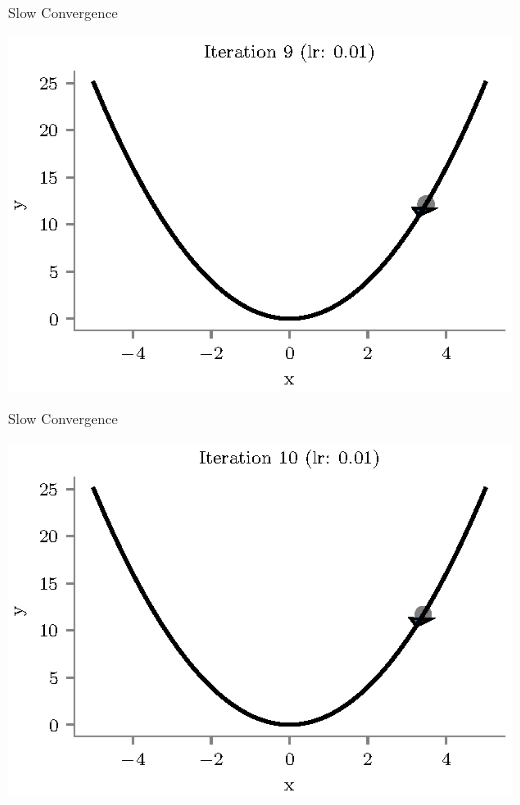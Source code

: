 \documentclass{beamer}
\begin{document}
\begin{frame}{Slow Convergence}
\begin{center}
\includegraphics[totalheight=6cm]{undershooting-9.eps}
\end{center}
\end{frame}

\begin{frame}{Slow Convergence}
\begin{center}
\includegraphics[totalheight=6cm]{undershooting-10.eps}
\end{center}
\end{frame}
\end{document}
